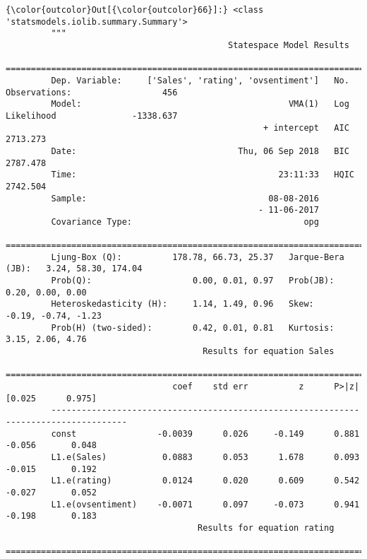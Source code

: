 \documentclass[11pt]{article}
\begin{document}
\begin{Verbatim}[commandchars=\\\{\}]
{\color{outcolor}Out[{\color{outcolor}66}]:} <class 'statsmodels.iolib.summary.Summary'>
         """
                                            Statespace Model Results                                   
         ==============================================================================================
         Dep. Variable:     ['Sales', 'rating', 'ovsentiment']   No. Observations:                  456
         Model:                                         VMA(1)   Log Likelihood               -1338.637
                                                   + intercept   AIC                           2713.273
         Date:                                Thu, 06 Sep 2018   BIC                           2787.478
         Time:                                        23:11:33   HQIC                          2742.504
         Sample:                                    08-08-2016                                         
                                                  - 11-06-2017                                         
         Covariance Type:                                  opg                                         
         ======================================================================================
         Ljung-Box (Q):          178.78, 66.73, 25.37   Jarque-Bera (JB):   3.24, 58.30, 174.04
         Prob(Q):                    0.00, 0.01, 0.97   Prob(JB):              0.20, 0.00, 0.00
         Heteroskedasticity (H):     1.14, 1.49, 0.96   Skew:               -0.19, -0.74, -1.23
         Prob(H) (two-sided):        0.42, 0.01, 0.81   Kurtosis:              3.15, 2.06, 4.76
                                       Results for equation Sales                             
         =====================================================================================
                                 coef    std err          z      P>|z|      [0.025      0.975]
         -------------------------------------------------------------------------------------
         const                -0.0039      0.026     -0.149      0.881      -0.056       0.048
         L1.e(Sales)           0.0883      0.053      1.678      0.093      -0.015       0.192
         L1.e(rating)          0.0124      0.020      0.609      0.542      -0.027       0.052
         L1.e(ovsentiment)    -0.0071      0.097     -0.073      0.941      -0.198       0.183
                                      Results for equation rating                             
         =====================================================================================

\end{Verbatim}
\end{document}
